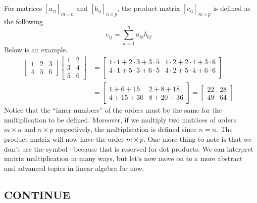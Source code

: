 \documentclass[../main.tex]{subfiles}
\begin{document}
For matrices $[a_{ij}]_{m \times n}$ and $[b_{ij}]_{n \times p}$,
the product matrix $[c_{ij}]_{m \times p}$ is defined as the
following.
\[
c_{ij}
= \sum_{k=1}^{n} a_{ik} b_{kj}
\]
Below is an example.
\begin{align*}
\begin{bmatrix}
    1 & 2 & 3 \\
    4 & 5 & 6
\end{bmatrix}
\begin{bmatrix}
    1 & 2 \\
    3 & 4 \\
    5 & 6
\end{bmatrix}
&=
\begin{bmatrix}
    1 \cdot 1 + 2 \cdot 3 + 3 \cdot 5 &
    1 \cdot 2 + 2 \cdot 4 + 3 \cdot 6 \\
    4 \cdot 1 + 5 \cdot 3 + 6 \cdot 5 &
    4 \cdot 2 + 5 \cdot 4 + 6 \cdot 6 \\
\end{bmatrix} \\
&=
\begin{bmatrix}
    1 + 6 + 15  & 2 + 8 + 18 \\
    4 + 15 + 30 & 8 + 20 + 36
\end{bmatrix}
=
\begin{bmatrix}
    22 & 28 \\
    49 & 64
\end{bmatrix}
\end{align*}
Notice that the ``inner numbers'' of the orders must be the same
for the multiplication to be defined. Moreover, if we multiply
two matrices of orders $m \times n$ and $n \times p$ respectively,
the multiplication is defined since $n = n$. The product matrix will
now have the order $m \times p$. One more thing to note is that
we don't use the symbol $\cdot$ because that is reserved for dot
products. We can interpret matrix multiplication in many ways, but
let's now move on to a more abstract and advanced topics in linear
algebra for now.

\subsection{CONTINUE}
\end{document}
